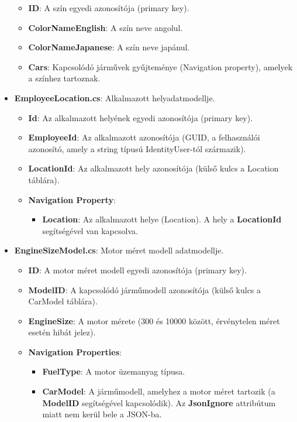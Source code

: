 \documentclass{report}[11pt]
\begin{document}
\begin{itemize}
\begin{itemize}
    \item \textbf{ID}: A szín egyedi azonosítója (primary key).
    \item \textbf{ColorNameEnglish}: A szín neve angolul.
    \item \textbf{ColorNameJapanese}: A szín neve japánul.
    \item \textbf{Cars}: Kapcsolódó járművek gyűjteménye (Navigation property), amelyek a színhez tartoznak.
\end{itemize}

\item \textbf{EmployeeLocation.cs}: Alkalmazott helyadatmodellje.

\begin{itemize}
    \item \textbf{Id}: Az alkalmazott helyének egyedi azonosítója (primary key).
    \item \textbf{EmployeeId}: Az alkalmazott azonosítója (GUID, a felhasználói azonosító, amely a string típusú IdentityUser-tól származik).
    \item \textbf{LocationId}: Az alkalmazott hely azonosítója (külső kulcs a Location táblára).
    \item \textbf{Navigation Property}:
    \begin{itemize}
        \item \textbf{Location}: Az alkalmazott helye (Location). A hely a \textbf{LocationId} segítségével van kapcsolva.
    \end{itemize}
\end{itemize}

\item \textbf{EngineSizeModel.cs}: Motor méret modell adatmodellje.

\begin{itemize}
    \item \textbf{ID}: A motor méret modell egyedi azonosítója (primary key).
    \item \textbf{ModelID}: A kapcsolódó járműmodell azonosítója (külső kulcs a CarModel táblára).
    \item \textbf{EngineSize}: A motor mérete (300 és 10000 között, érvénytelen méret esetén hibát jelez).
    \item \textbf{Navigation Properties}:
    \begin{itemize}
        \item \textbf{FuelType}: A motor üzemanyag típusa.
        \item \textbf{CarModel}: A járműmodell, amelyhez a motor méret tartozik (a \textbf{ModelID} segítségével kapcsolódik). Az \textbf{JsonIgnore} attribútum miatt nem kerül bele a JSON-ba.
    \end{itemize}


\end{itemize}
\end{itemize}
\end{document}
